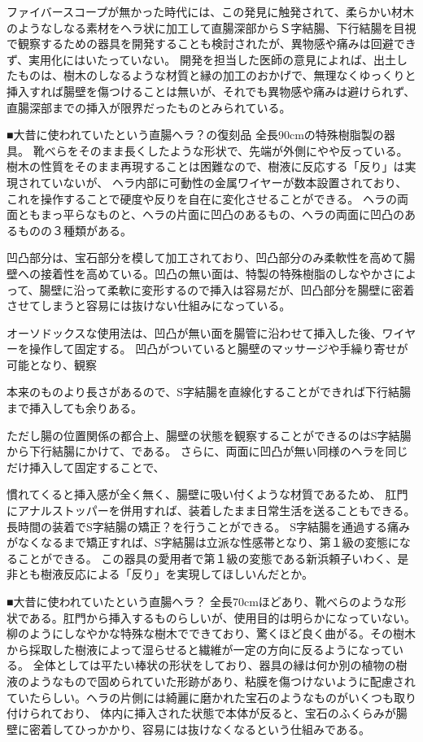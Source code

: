 ファイバースコープが無かった時代には、この発見に触発されて、柔らかい材木のようなしなる素材をヘラ状に加工して直腸深部からＳ字結腸、下行結腸を目視で観察するための器具を開発することも検討されたが、異物感や痛みは回避できず、実用化にはいたっていない。
開発を担当した医師の意見によれば、出土したものは、樹木のしなるような材質と縁の加工のおかげで、無理なくゆっくりと挿入すれば腸壁を傷つけることは無いが、それでも異物感や痛みは避けられず、直腸深部までの挿入が限界だったものとみられている。

■大昔に使われていたという直腸ヘラ？の復刻品
全長90cmの特殊樹脂製の器具。
靴べらをそのまま長くしたような形状で、先端が外側にやや反っている。
樹木の性質をそのまま再現することは困難なので、樹液に反応する「反り」は実現されていないが、
ヘラ内部に可動性の金属ワイヤーが数本設置されており、これを操作することで硬度や反りを自在に変化させることができる。
ヘラの両面ともまっ平らなものと、ヘラの片面に凹凸のあるもの、ヘラの両面に凹凸のあるものの３種類がある。

凹凸部分は、宝石部分を模して加工されており、凹凸部分のみ柔軟性を高めて腸壁への接着性を高めている。凹凸の無い面は、特製の特殊樹脂のしなやかさによって、腸壁に沿って柔軟に変形するので挿入は容易だが、凹凸部分を腸壁に密着させてしまうと容易には抜けない仕組みになっている。

オーソドックスな使用法は、凹凸が無い面を腸管に沿わせて挿入した後、ワイヤーを操作して固定する。
凹凸がついていると腸壁のマッサージや手繰り寄せが可能となり、観察

本来のものより長さがあるので、S字結腸を直線化することができれば下行結腸まで挿入しても余りある。

ただし腸の位置関係の都合上、腸壁の状態を観察することができるのはS字結腸から下行結腸にかけて、である。
さらに、両面に凹凸が無い同様のヘラを同じだけ挿入して固定することで、

慣れてくると挿入感が全く無く、腸壁に吸い付くような材質であるため、
肛門にアナルストッパーを併用すれば、装着したまま日常生活を送ることもできる。
長時間の装着でS字結腸の矯正？を行うことができる。
S字結腸を通過する痛みがなくなるまで矯正すれば、S字結腸は立派な性感帯となり、第１級の変態になることができる。
この器具の愛用者で第１級の変態である新浜頼子いわく、是非とも樹液反応による「反り」を実現してほしいんだとか。






■大昔に使われていたという直腸ヘラ？
全長70cmほどあり、靴べらのような形状である。肛門から挿入するものらしいが、使用目的は明らかになっていない。
柳のようにしなやかな特殊な樹木でできており、驚くほど良く曲がる。その樹木から採取した樹液によって湿らせると繊維が一定の方向に反るようになっている。
全体としては平たい棒状の形状をしており、器具の縁は何か別の植物の樹液のようなもので固められていた形跡があり、粘膜を傷つけないように配慮されていたらしい。ヘラの片側には綺麗に磨かれた宝石のようなものがいくつも取り付けられており、
体内に挿入された状態で本体が反ると、宝石のふくらみが腸壁に密着してひっかかり、容易には抜けなくなるという仕組みである。

